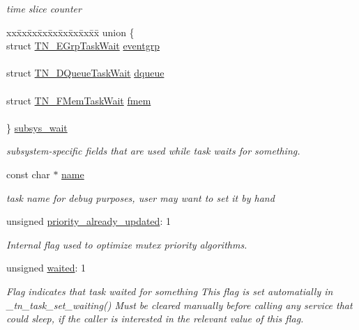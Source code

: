 \begin{DoxyCompactItemize}
\begin{DoxyCompactList}\small\item\em time slice counter \end{DoxyCompactList}\item 
\begin{tabbing}
xx\=xx\=xx\=xx\=xx\=xx\=xx\=xx\=xx\=\kill
union \{\\
\>struct \hyperlink{structTN__EGrpTaskWait}{TN\_EGrpTaskWait} \hyperlink{structTN__Task_a22c8cfe2e95d6f891aa568cafdb95936}{eventgrp}\\
\>\\
\>struct \hyperlink{structTN__DQueueTaskWait}{TN\_DQueueTaskWait} \hyperlink{structTN__Task_aa536e1eba96904c006d1e61efc520378}{dqueue}\\
\>\\
\>struct \hyperlink{structTN__FMemTaskWait}{TN\_FMemTaskWait} \hyperlink{structTN__Task_a31921e5384127319bffd5ae09debac1e}{fmem}\\
\>\\
\} \hyperlink{structTN__Task_a7b1e431e2e2c65d8de74d48b44cf68ee}{subsys\_wait}\\

\end{tabbing}\begin{DoxyCompactList}\small\item\em subsystem-\/specific fields that are used while task waits for something. \end{DoxyCompactList}\item 
\hypertarget{structTN__Task_aed03c90906ffe2dcbcc49d8badc74147}{const char $\ast$ \hyperlink{structTN__Task_aed03c90906ffe2dcbcc49d8badc74147}{name}}\label{structTN__Task_aed03c90906ffe2dcbcc49d8badc74147}

\begin{DoxyCompactList}\small\item\em task name for debug purposes, user may want to set it by hand \end{DoxyCompactList}\item 
unsigned \hyperlink{structTN__Task_abb4d22974c7317dd610f646b9048656d}{priority\+\_\+already\+\_\+updated}\+: 1
\begin{DoxyCompactList}\small\item\em Internal flag used to optimize mutex priority algorithms. \end{DoxyCompactList}\item 
unsigned \hyperlink{structTN__Task_a47c3a0a27be1ee526a1599a2ca8bb269}{waited}\+: 1
\begin{DoxyCompactList}\small\item\em Flag indicates that task waited for something This flag is set automatially in {\ttfamily \+\_\+tn\+\_\+task\+\_\+set\+\_\+waiting()} Must be cleared manually before calling any service that could sleep, if the caller is interested in the relevant value of this flag. \end{DoxyCompactList}\end{DoxyCompactItemize}


